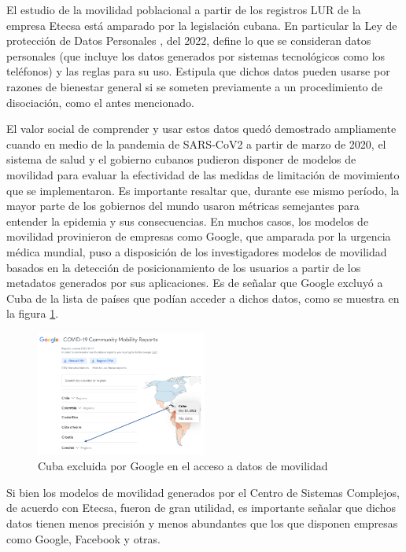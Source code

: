 El estudio de la movilidad poblacional a partir de los registros LUR de la empresa Etecsa está amparado por la legislación cubana. En particular la Ley de protección de Datos Personales \cite{cuervo2022resolucion}, del 2022, define lo que se consideran datos personales (que incluye los datos generados por sistemas tecnológicos como los teléfonos) y las reglas para su uso. Estipula que dichos datos pueden usarse por razones de bienestar general si se someten previamente a un procedimiento de disociación, como el antes mencionado.

El valor social de comprender y usar estos datos quedó demostrado ampliamente cuando en medio de la pandemia de SARS-CoV2 a partir de marzo de 2020, el sistema de salud y el gobierno cubanos pudieron disponer de modelos de movilidad para evaluar la efectividad de las medidas de limitación de movimiento que se implementaron. Es importante resaltar que, durante ese mismo período, la mayor parte de los gobiernos del mundo usaron métricas semejantes para entender la epidemia y sus consecuencias. En muchos casos, los modelos de movilidad provinieron de empresas como Google, que amparada por la urgencia médica mundial, puso a disposición de los investigadores modelos de movilidad basados en la detección de posicionamiento de los usuarios a partir de los metadatos generados por sus aplicaciones. Es de señalar que Google excluyó a Cuba de la lista de países que podían acceder a dichos datos, como se muestra en la figura \ref{fig:google_exclusion}.

\begin{figure}[!htb] \centering \includegraphics[width=0.5\textwidth]{Graphics/google_exclusion.pdf} \caption{Cuba excluida por Google en el acceso a datos de movilidad} \label{fig:google_exclusion} \end{figure}

Si bien los modelos de movilidad generados por el Centro de Sistemas Complejos, de acuerdo con Etecsa, fueron de gran utilidad, es importante señalar que dichos datos tienen menos precisión y menos abundantes que los que disponen empresas como Google, Facebook y otras.

